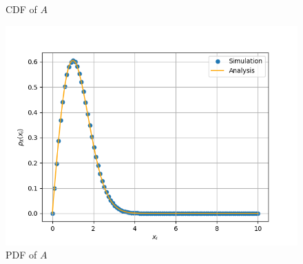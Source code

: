 \documentclass[journal,10pt,twocolumn]{article}
\begin{document}
\begin{enumerate}
\begin{figure}[h]
\caption{CDF of $A$}
\label{fig:rayleigh_cdf}
\end{figure}
\begin{figure}[h]
\centering
\includegraphics[width=\columnwidth]{./chapters/ch4/figs/ch4_sqrtpdf.png}
\caption{PDF of $A$}
\label{fig:rayleigh_pdf}
\end{figure}
%
\bigskip

\end{enumerate}
\end{document}
